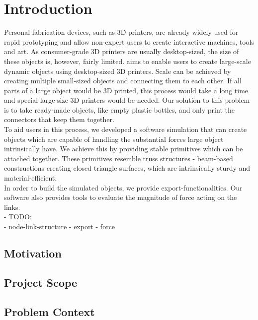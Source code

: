 \chapter{Introduction}\label{ch:introduction}
Personal fabrication devices, such as 3D printers, are already widely used for rapid prototyping and allow non-expert users to create interactive machines, tools and art. As consumer-grade 3D printers are usually desktop-sized, the size of these objects is, however, fairly limited. \trussFabName{} aims to enable users to create large-scale dynamic objects using desktop-sized 3D printers. Scale can be achieved by creating multiple small-sized objects and connecting them to each other. If all parts of a large object would be 3D printed, this process would take a long time and special large-size 3D printers would be needed. Our solution to this problem is to take ready-made objects, like empty plastic bottles, and only print the connectors that keep them together.\\
To aid users in this process, we developed a software simulation that can create objects which are capable of handling the substantial forces large object intrinsically have. We achieve this by providing stable primitives which can be attached together. These primitives resemble truss structures - beam-based constructions creating closed triangle surfaces, which are intrinsically sturdy and material-efficient.\\
In order to build the simulated objects, we provide export-functionalities.
Our software also provides tools to evaluate the magnitude of force acting on the links.\\
- TODO:\\
- node-link-structure
- export
- force
\section{Motivation}
\clearpage
\section{Project Scope}
\clearpage
\section{Problem Context}
